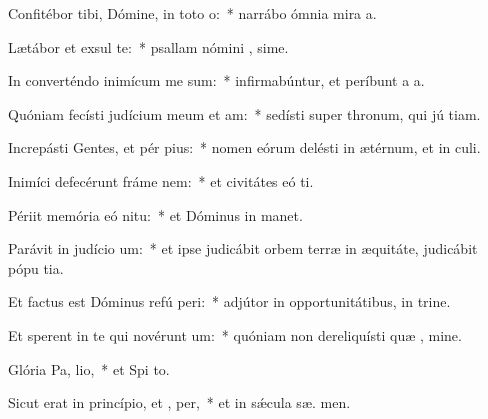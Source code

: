\item Confitébor tibi, Dómine, in toto  o:~* narrábo ómnia mira a.
\item Lætábor et exsul  te:~* psallam nómini , sime.
\item In converténdo inimícum me sum:~* infirmabúntur, et períbunt a  a.
\item Quóniam fecísti judícium meum et  am:~* sedísti super thronum, qui jú tiam.
\item Increpásti Gentes, et pér pius:~* nomen eórum delésti in ætérnum, et in  culi.
\item Inimíci defecérunt fráme  nem:~* et civitátes eó ti.
\item Périit memória eó  nitu:~* et Dóminus in  manet.
\item Parávit in judício  um:~* et ipse judicábit orbem terræ in æquitáte, judicábit pópu  tia.
\item Et factus est Dóminus refú peri:~* adjútor in opportunitátibus, in trine.
\item Et sperent in te qui novérunt  um:~* quóniam non dereliquísti quæ , mine.
\item Glória Pa,  lio,~* et Spi to.
\item Sicut erat in princípio, et ,  per,~* et in sǽcula sæ. men.
